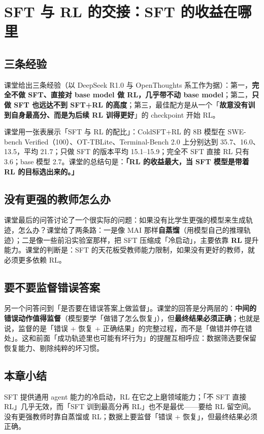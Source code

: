 \documentclass[a4paper]{article}
\begin{document}
\section{SFT 与 RL 的交接：SFT 的收益在哪里}

\subsection{三条经验}

课堂给出三条经验（以 DeepSeek R1.0 与 OpenThoughts 系工作为据）：第一，\textbf{完全不做 SFT、直接对 base model 做 RL，几乎带不动 base model}；第二，\textbf{只做 SFT 也远达不到 SFT+RL 的高度}；第三，最佳配方是从一个「\textbf{故意没有训到自身最高分、而是为后续 RL 训得更好}」的 checkpoint 开始 RL。

课堂用一张表展示「SFT 与 RL 的配比」：ColdSFT+RL 的 8B 模型在 SWE-bench Verified（100）、OT-TBLite、Terminal-Bench 2.0 上分别达到 35.7、16.0、13.5，平均 21.7；只做 SFT 的版本平均 15.1--15.9；完全不 SFT 直接 RL 只有 3.6；base 模型 2.7。课堂的总结句是：\textbf{「RL 的收益最大，当 SFT 模型是带着 RL 的目标选出来的。」}

\subsection{没有更强的教师怎么办}

课堂最后的问答讨论了一个很实际的问题：如果没有比学生更强的模型来生成轨迹，怎么办？课堂给了两条路：一是像 MAI 那样\textbf{自蒸馏}（用模型自己的推理轨迹）；二是像一些前沿实验室那样，把 SFT 压缩成「冷启动」，主要依靠 \textbf{RL} 提升能力。课堂的判断是：SFT 的天花板受教师能力限制，如果没有更好的教师，就必须更多依赖 RL。

\subsection{要不要监督错误答案}

另一个问答问到「是否要在错误答案上做监督」。课堂的回答是分两层的：\textbf{中间的错误动作值得监督}（模型要学「做错了怎么恢复」），但\textbf{最终结果必须正确}；也就是说，监督的是「错误 + 恢复 + 正确结果」的完整过程，而不是「做错并停在错处」。这和前面「成功轨迹里也可能有坏行为」的提醒互相呼应：数据筛选要保留恢复能力、剔除纯粹的坏习惯。

\subsection{本章小结}
SFT 提供通用 agent 能力的冷启动，RL 在它之上磨领域能力；「不 SFT 直接 RL」几乎无效，而「SFT 训到最高分再 RL」也不是最优——要给 RL 留空间。没有更强教师时靠自蒸馏或 RL；数据上要监督「错误 + 恢复」，但最终结果必须正确。
\end{document}
